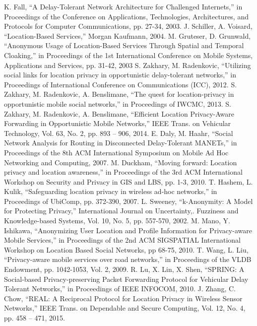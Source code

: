 \documentclass[conference]{IEEEtran}
\begin{document}
\begin{thebibliography}{00}
 K. Fall, ``A Delay-Tolerant Network Architecture for Challenged Internets,'' in Proceedings of the Conference on Applications, Technologies, Architectures, and Protocols for Computer Communications, pp. 27-34, 2003.
 J. Schiller, A. Voisard, ``Location-Based Services,'' Morgan Kaufmann, 2004.
 M. Gruteser, D. Grunwald, ``Anonymous Usage of Location-Based Services Through Spatial and Temporal Cloaking,'' in Proceedings of the 1st International Conference on Mobile Systems, Applications and Services, pp. 31-42, 2003
 S. Zakhary, M. Radenkovic, ``Utilizing social links for location privacy in opportunistic delay-tolerant networks,'' in Proceedings of International Conference on Communications (ICC), 2012.
 S. Zakhary, M. Radenkovic, A. Benslimane, ``The quest for location-privacy in opportunistic mobile social networks,'' in Proceedings of IWCMC, 2013.
 S. Zakhary, M. Radenkovic, A. Benslimane, ``Efficient Location Privacy-Aware Forwarding in Opportunistic Mobile Networks,''  IEEE Trans. on Vehicular Technology, Vol. 63, No. 2, pp. 893 – 906, 2014.
 E. Daly, M. Haahr, ``Social Network Analysis for Routing in Disconnected Delay-Tolerant MANETs,'' in Proceedings of the 8th ACM International Symposium on Mobile Ad Hoc Networking and Computing, 2007.
 M. Duckham, ``Moving forward: Location privacy and location awareness,'' in Proceedings of the 3rd ACM International Workshop on Security and Privacy in GIS and LBS, pp. 1-3, 2010.
 T. Hashem, L. Kulik, ``Safeguarding location privacy in wireless ad-hoc networks,'' in Proceedings of  UbiComp, pp. 372-390,  2007.
 L. Sweeney, ``k-Anonymity: A Model for Protecting Privacy,'' International Journal on Uncertainty,. Fuzziness and Knowledge-based Systems, Vol. 10, No. 5, pp. 557-570, 2002. 
 M. Mano, Y. Ishikawa, ``Anonymizing User Location and Profile Information for Privacy-aware Mobile Services,'' in Proceedings of the 2nd ACM SIGSPATIAL International Workshop on Location Based Social Networks, pp 68-75, 2010.
 T. Wang, L. Liu, ``Privacy-aware mobile services over road networks,'' in Proceedings of the VLDB Endowment, pp. 1042-1053, Vol. 2,  2009.
 R. Lu, X. Lin, X. Shen, ``SPRING: A Social-based Privacy-preserving Packet Forwarding Protocol for Vehicular Delay Tolerant Networks,'' in Proceedings of IEEE INFOCOM, 2010.
 J. Zhang, C. Chow, ``REAL: A Reciprocal Protocol for Location Privacy in Wireless Sensor Networks,'' IEEE Trans. on Dependable and Secure Computing, Vol. 12, No. 4, pp. 458 – 471, 2015.

\end{thebibliography}
\end{document}
